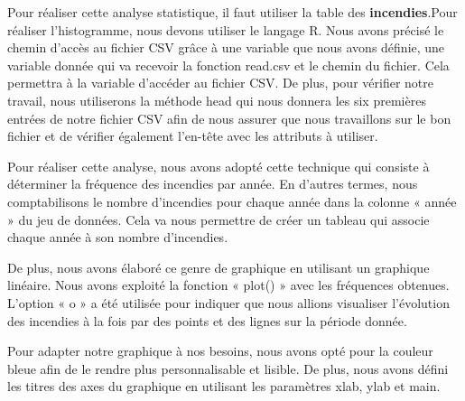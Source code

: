 \documentclass[
]{article}
\newenvironment{Shaded}{\begin{snugshade}}{\end{snugshade}}
\newcommand{\AttributeTok}[1]{\textcolor[rgb]{0.13,0.29,0.53}{#1}}
\newcommand{\CommentTok}[1]{\textcolor[rgb]{0.56,0.35,0.01}{\textit{#1}}}
\newcommand{\FunctionTok}[1]{\textcolor[rgb]{0.13,0.29,0.53}{\textbf{#1}}}
\newcommand{\NormalTok}[1]{#1}
\newcommand{\OtherTok}[1]{\textcolor[rgb]{0.56,0.35,0.01}{#1}}
\newcommand{\SpecialCharTok}[1]{\textcolor[rgb]{0.81,0.36,0.00}{\textbf{#1}}}
\newcommand{\StringTok}[1]{\textcolor[rgb]{0.31,0.60,0.02}{#1}}
\begin{document}
Pour réaliser cette analyse statistique, il faut utiliser la table des
\textbf{incendies}.Pour réaliser l'histogramme, nous devons utiliser le
langage R. Nous avons précisé le chemin d'accès au fichier CSV grâce à
une variable que nous avons définie, une variable donnée qui va recevoir
la fonction read.csv et le chemin du fichier. Cela permettra à la
variable d'accéder au fichier CSV. De plus, pour vérifier notre travail,
nous utiliserons la méthode head qui nous donnera les six premières
entrées de notre fichier CSV afin de nous assurer que nous travaillons
sur le bon fichier et de vérifier également l'en-tête avec les attributs
à utiliser.

Pour réaliser cette analyse, nous avons adopté cette technique qui
consiste à déterminer la fréquence des incendies par année. En d'autres
termes, nous comptabilisons le nombre d'incendies pour chaque année dans
la colonne « année » du jeu de données. Cela va nous permettre de créer
un tableau qui associe chaque année à son nombre d'incendies.

De plus, nous avons élaboré ce genre de graphique en utilisant un
graphique linéaire. Nous avons exploité la fonction « plot() » avec les
fréquences obtenues. L'option « o » a été utilisée pour indiquer que
nous allions visualiser l'évolution des incendies à la fois par des
points et des lignes sur la période donnée.

Pour adapter notre graphique à nos besoins, nous avons opté pour la
couleur bleue afin de le rendre plus personnalisable et lisible. De
plus, nous avons défini les titres des axes du graphique en utilisant
les paramètres xlab, ylab et main.

\begin{Shaded}
\end{Shaded}
\end{document}
